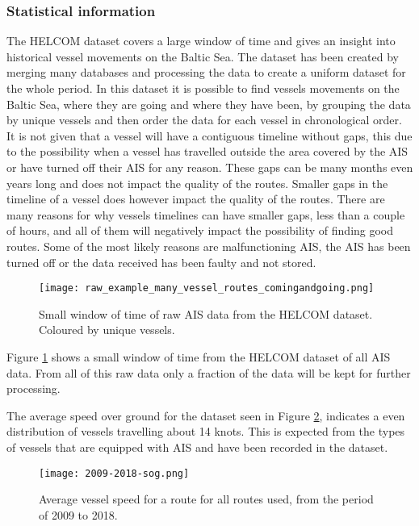 \documentclass[../main.tex]{subfiles}
\begin{document}
\subsubsection{Statistical information}
\label{sec:AIS-stat}
The HELCOM dataset covers a large window of time and gives an insight into historical vessel movements on the Baltic Sea. The dataset has been created by merging many databases and processing the data to create a uniform dataset for the whole period. In this dataset it is possible to find vessels movements on the Baltic Sea, where they are going and where they have been, by grouping the data by unique vessels and then order the data for each vessel in chronological order. It is not given that a vessel will have a contiguous timeline without gaps, this due to the possibility when a vessel has travelled outside the area covered by the AIS or have turned off their AIS for any reason. These gaps can be many months even years long and does not impact the quality of the routes. Smaller gaps in the timeline of a vessel does however impact the quality of the routes. There are many reasons for why vessels timelines can have smaller gaps, less than a couple of hours, and all of them will negatively impact the possibility of finding good routes. Some of the most likely reasons are malfunctioning AIS, the AIS has been turned off or the data received has been faulty and not stored.

\begin{figure}[H]
	\centering
	\texttt{[image: raw\_example\_many\_vessel\_routes\_comingandgoing.png]}
	\caption{Small window of time of raw AIS data from the HELCOM dataset. Coloured by unique vessels.}
	\label{fig:raw-ais-data}
\end{figure}

Figure \ref{fig:raw-ais-data} shows a small window of time from the HELCOM dataset of all AIS data. From all of this raw data only a fraction of the data will be kept for further processing.

The average speed over ground for the dataset seen in Figure \ref{fig:sog-dist}, indicates a even distribution of vessels travelling about 14 knots. This is expected from the types of vessels that are equipped with AIS and have been recorded in the dataset.

\begin{figure}[H]
	\centering
	\texttt{[image: 2009-2018-sog.png]}
	\caption{Average vessel speed for a route for all routes used, from the period of 2009 to 2018.}
	\label{fig:sog-dist}
\end{figure}
\end{document}
